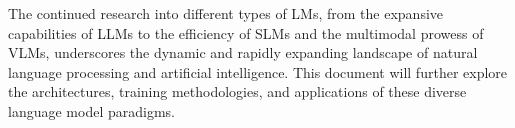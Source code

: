 \documentclass{article}
\begin{document}
The continued research into different types of LMs, from the expansive capabilities of LLMs to the efficiency of SLMs and the multimodal prowess of VLMs, underscores the dynamic and rapidly expanding landscape of natural language processing and artificial intelligence. This document will further explore the architectures, training methodologies, and applications of these diverse language model paradigms.

\printbibliography
\end{document}
